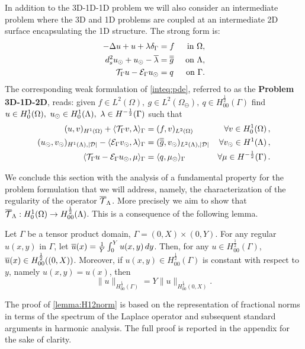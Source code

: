 \documentclass[r]{siamart171218}
\newcommand{\paolo}[1]{{\color{black}#1}}
\begin{document}
In addition to the 3D-1D-1D problem we will also consider an 
intermediate problem where the 3D and 1D problems are coupled at an
intermediate 2D surface  encapsulating the 1D structure. The strong form is:  
\paolo{
\begin{subequations}
\label{inteq:pde}
\begin{align}
\label{inteq:pde1}
  -\Delta u + u + \lambda \delta_{\Gamma} &= f &\mbox{ in } \Omega,\\ 
\label{inteq:pde2}
 d_s^2 \ud + \ud -  \avrc{\lambda} &= \avrd{g} &\mbox{ on } \Lambda,\\
\label{inteq:coupling}
\mathcal{T}_\Gamma u - \mathcal{E}_\Gamma \ud  &=  q &\mbox{ on } \Gamma . 
\end{align}
\end{subequations}
}
The corresponding weak formulation of \eqref{inteq:pde}, referred to as the \textbf{Problem 3D-1D-2D}, reads: 
\paolo{given $f\in L^2(\Omega), \ g \in L^2(\Omega_{\ominus}), \ q \in H^\frac12_{00}(\Gamma)$}
find $u \in H^1_0(\Omega), \ u_{\odot} \in H^1_0(\Lambda), \ \lambda \in H^{-\frac 1 2}(\Gamma ) $ such that
\begin{subequations}\label{eq:problem1}
\begin{align}
(u,v)_{H^1(\Omega)} + \langle \trace v, \lambda \rangle_\Gamma &= (f,v)_{L^2(\Omega)} &\forall v \in H^1_0(\Omega)\, ,
\\
 (\ud,\vd)_{H^1(\Lambda),|\D|}  -  \langle \ext \vd, \lambda \rangle_\Gamma
&=  (\avrd{g},\vd)_{L^2(\Lambda),|\D|} &\forall\vd \in H^1(\Lambda)\, ,
\\
\langle \trace u - \ext \ud , \mu \rangle_\Gamma 
&= \paolo{\langle q,\md\rangle_\Gamma} 
&\forall \mu \in H^{-\frac 1 2}(\Gamma)\,.
\end{align}
\end{subequations}

We conclude this section with the analysis of a fundamental property for the problem formulation that we will address, namely, the characterization of the regularity of the operator ${\overline{\mathcal{T}}_\Lambda}$. More precisely we aim to show that ${\overline{\mathcal{T}}_\Lambda}: H^1_0(\Omega) \rightarrow H^\frac 1 2_{00}(\Lambda)$.
This is a consequence of the following lemma.

\begin{lemma}\label{lemma:H12norm}
Let $\Gamma$ be a tensor product domain, $\Gamma= (0,X) \times (0,Y)$. For any regular $u(x,y)$ in $\Gamma$, let $\overline{u}(x)=\frac 1Y \int _0^Y u(x,y)\, dy$. Then, for any $u\in H_{00}^{\frac 12}(\Gamma)$, $\overline{u}(x)\in H_{00}^{\frac 12}((0,X))$. 
Moreover, if $u(x,y)\in H^{\frac 12}_{00}(\Gamma)$ is constant with respect to $y$, namely $u(x,y)=u(x)$, then 
\begin{equation*}
\|u\|_{H^{\frac 12}_{00}(\Gamma)}=Y \|u\|_{H^{\frac 12}_{00}(0,X)}.
\end{equation*}
\end{lemma}
The proof of \ref{lemma:H12norm} is based on the representation of fractional norms in terms of the spectrum of the Laplace operator and subsequent standard arguments in harmonic analysis. The full proof is reported in the appendix for the sake of clarity.
\end{document}
